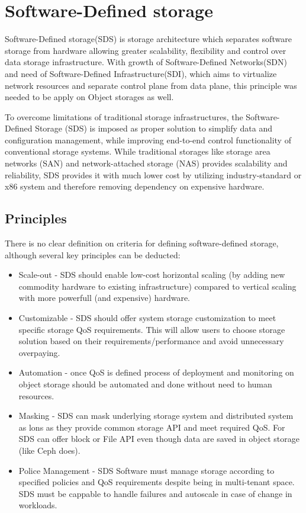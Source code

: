 \section{Software-Defined storage}
    Software-Defined storage(SDS) is storage architecture which separates software storage from hardware allowing greater scalability, flexibility and control over data storage infrastructure.
    With growth of Software-Defined Networks(SDN) and need of Software-Defined Infrastructure(SDI), which aims to virtualize network resources and separate control plane from data plane, this principle was needed to be apply on Object storages as well\cite{sdsSDSMultiTenantEnv}.

    To overcome limitations of traditional storage infrastructures, the Software-Defined Storage (SDS) is imposed as proper solution to simplify data and configuration management, while improving end-to-end control functionality of conventional storage systems\cite{sdsSurvey}. While traditional storages like  storage area networks (SAN) and network-attached storage (NAS) provides scalability and reliability, SDS provides it with much lower cost by utilizing industry-standard or x86 system and therefore removing dependency on expensive hardware\cite{sdsWPRedHatSDS}.

    \subsection{Principles}
    There is no clear definition on criteria for defining software-defined storage, although several key principles can be deducted\cite{sdsGPCloudStorage}:
    \begin{itemize}
        \item Scale-out - SDS should enable low-cost horizontal scaling (by adding new commodity hardware to existing infrastructure) compared to vertical scaling with more powerfull (and expensive) hardware.
        \item Customizable - SDS should offer system storage customization to meet specific storage QoS requirements. This will allow users to choose storage solution based on their requirements/performance and avoid unnecessary overpaying.
        \item Automation - once QoS is defined process of deployment and monitoring on object storage should be automated and done without need to human resources.
        \item Masking - SDS can mask underlying storage system and distributed system as lons as they provide common storage API and meet required QoS. For SDS can offer block or File API even though data are saved in object storage (like Ceph does).
        \item Police Management - SDS Software must manage storage according to specified policies and QoS requirements despite being in multi-tenant space. SDS must be cappable to handle failures and autoscale in case of change in workloads.
    \end{itemize}



